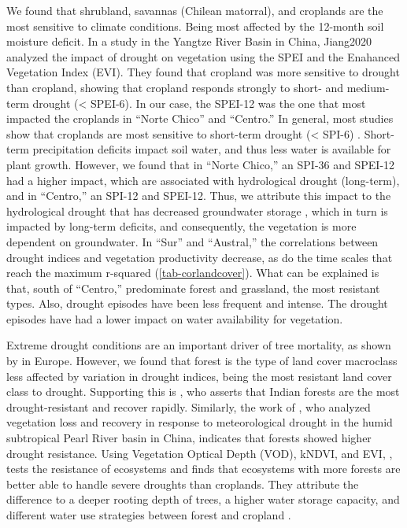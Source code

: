 \documentclass[
  authoryear,
  preprint,
  3p,
  onecolumn]{elsarticle}
\begin{document}
We found that shrubland, savannas (Chilean matorral), and croplands are
the most sensitive to climate conditions. Being most affected by the
12-month soil moisture deficit. In a study in the Yangtze River Basin in
China, Jiang2020 analyzed the impact of drought on vegetation using the
SPEI and the Enahanced Vegetation Index (EVI). They found that cropland
was more sensitive to drought than cropland, showing that cropland
responds strongly to short- and medium-term drought (\textless{}
SPEI-6). In our case, the SPEI-12 was the one that most impacted the
croplands in ``Norte Chico'' and ``Centro.'' In general, most studies
show that croplands are most sensitive to short-term drought
(\textless{} SPI-6)
\citep{Zambrano2016, Potopova2015, Dai2020, Rhee2010}. Short-term
precipitation deficits impact soil water, and thus less water is
available for plant growth. However, we found that in ``Norte Chico,''
an SPI-36 and SPEI-12 had a higher impact, which are associated with
hydrological drought (long-term), and in ``Centro,'' an SPI-12 and
SPEI-12. Thus, we attribute this impact to the hydrological drought that
has decreased groundwater storage \citep{Taucare2024}, which in turn is
impacted by long-term deficits, and consequently, the vegetation is more
dependent on groundwater. In ``Sur'' and ``Austral,'' the correlations
between drought indices and vegetation productivity decrease, as do the
time scales that reach the maximum r-squared (\ref{tab-corlandcover}).
What can be explained is that, south of ``Centro,'' predominate forest
and grassland, the most resistant types. Also, drought episodes have
been less frequent and intense. The drought episodes have had a lower
impact on water availability for vegetation.

Extreme drought conditions are an important driver of tree mortality, as
shown by \citet{Senf2020} in Europe. However, we found that forest is
the type of land cover macroclass less affected by variation in drought
indices, being the most resistant land cover class to drought.
Supporting this is \citet{Fathi-Taperasht2022}, who asserts that Indian
forests are the most drought-resistant and recover rapidly. Similarly,
the work of \citet{Wu2024}, who analyzed vegetation loss and recovery in
response to meteorological drought in the humid subtropical Pearl River
basin in China, indicates that forests showed higher drought resistance.
Using Vegetation Optical Depth (VOD), kNDVI, and EVI, \citet{Xiao2023},
tests the resistance of ecosystems and finds that ecosystems with more
forests are better able to handle severe droughts than croplands. They
attribute the difference to a deeper rooting depth of trees, a higher
water storage capacity, and different water use strategies between
forest and cropland \citep{Xiao2023}.
\end{document}
